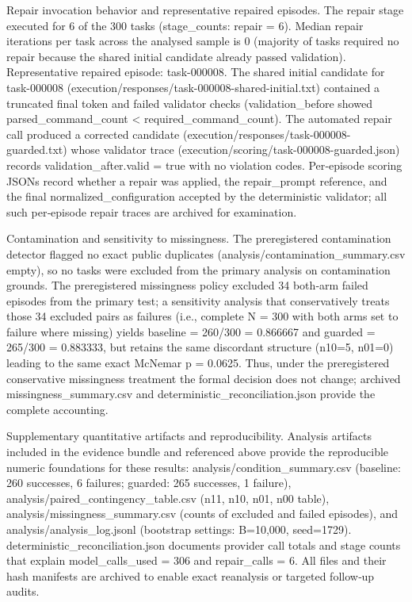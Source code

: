 \documentclass[conference]{IEEEtran}
\begin{document}
Repair invocation behavior and representative repaired episodes. The repair stage executed for 6 of the 300 tasks (stage\_counts: repair = 6). Median repair iterations per task across the analysed sample is 0 (majority of tasks required no repair because the shared initial candidate already passed validation). Representative repaired episode: task-000008. The shared initial candidate for task-000008 (execution/responses/task-000008-shared-initial.txt) contained a truncated final token and failed validator checks (validation\_before showed parsed\_command\_count < required\_command\_count). The automated repair call produced a corrected candidate (execution/responses/task-000008-guarded.txt) whose validator trace (execution/scoring/task-000008-guarded.json) records validation\_after.valid = true with no violation codes. Per‑episode scoring JSONs record whether a repair was applied, the repair\_prompt reference, and the final normalized\_configuration accepted by the deterministic validator; all such per‑episode repair traces are archived for examination.

Contamination and sensitivity to missingness. The preregistered contamination detector flagged no exact public duplicates (analysis/contamination\_summary.csv empty), so no tasks were excluded from the primary analysis on contamination grounds. The preregistered missingness policy excluded 34 both‑arm failed episodes from the primary test; a sensitivity analysis that conservatively treats those 34 excluded pairs as failures (i.e., complete N = 300 with both arms set to failure where missing) yields baseline = 260/300 = 0.866667 and guarded = 265/300 = 0.883333, but retains the same discordant structure (n10=5, n01=0) leading to the same exact McNemar p = 0.0625. Thus, under the preregistered conservative missingness treatment the formal decision does not change; archived missingness\_summary.csv and deterministic\_reconciliation.json provide the complete accounting.

Supplementary quantitative artifacts and reproducibility. Analysis artifacts included in the evidence bundle and referenced above provide the reproducible numeric foundations for these results: analysis/condition\_summary.csv (baseline: 260 successes, 6 failures; guarded: 265 successes, 1 failure), analysis/paired\_contingency\_table.csv (n11, n10, n01, n00 table), analysis/missingness\_summary.csv (counts of excluded and failed episodes), and analysis/analysis\_log.jsonl (bootstrap settings: B=10,000, seed=1729). deterministic\_reconciliation.json documents provider call totals and stage counts that explain model\_calls\_used = 306 and repair\_calls = 6. All files and their hash manifests are archived to enable exact reanalysis or targeted follow‑up audits.
\end{document}
